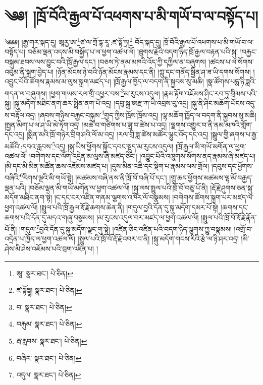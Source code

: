 \setcounter{footnote}{0} 
\chapter{༄༅། །ཁྲོ་བོའི་རྒྱལ་པོ་འཕགས་པ་མི་གཡོ་བ་ལ་བསྟོད་པ།}༄༅༅། །རྒྱ་གར་སྐད་དུ། ཨཱརྱ་ཨ་\footnote{ཨཱ་  སྣར་ཐང་།  པེ་ཅིན། }ཙ་ལ་ཀྲོ་དྷ་རཱ་:ཛ་སྟོ་ཏྲ།\footnote{ཛ་སྟོཏྟཱ།  སྣར་ཐང་།  པེ་ཅིན། } བོད་སྐད་དུ། ཁྲོ་བོའི་རྒྱལ་པོ་འཕགས་པ་མི་གཡོ་བ་ལ་བསྟོད་པ། བཅོམ་ལྡན་འདས་མི་བསྐྱོད་པ་ལ་ཕྱག་འཚལ་ལོ། །ཐུགས་རྗེའི་བདག་ཉིད་ཁྲོ་རྒྱལ་བརྟན་པའི་སྐུ། །བརྐྱང་བསྐུམ་ཐབས་ལས་བྱུང་བའི་ཁྲོ་རྒྱལ་དང་། །བཅས་ཏེ་ནམ་མཁའི་འོད་ཀྱི་དཀྱིལ་ན་བཞུགས། །ཚངས་པ་ལ་སོགས་འབུམ་ནི་སྐྲག་བྱེད་པ། །ཉོན་མོངས་ཉེ་བའི་ཉོན་མོངས་རྣམས་དང་ནི། །ཀླུ་དང་གནོད་སྦྱིན་ཤ་ཟ་ཡི་དགས་སོགས། །འབྱུང་པོའི་ཚོགས་རྣམས་མ་ལུས་སྐྲག་མཛད་པ། །ཁྲོ་རྒྱལ་ཁྱོད་ལ་བདག་ནི་སྐྱབས་སུ་མཆི། །སྣ་ཚོགས་པདྨ་ཉི་ཟླའི་གདན་ལ་བཞུགས། །ཕྱག་གཡས་རལ་གྲི་འཕྱར་བས་\footnote{བ་  སྣར་ཐང་།  པེ་ཅིན། }མ་རུངས་འདུལ། །རྣམ་རྟོག་འཇོམས་ཤིང་རབ་ཏུ་གྲིམས་པའི་སྐུ། །སྐུ་མདོག་མཐིང་ནག་ཆར་སྤྲིན་ནག་པོ་འདྲ། །དབུ་སྐྲ་ཨརྫ་ཀ་ཡི་འབྲས་བུ་འདྲ། །སྐུ་ནི་ཤིང་མཆོག་ཡོངས་འདུ་ས་བརྟོལ་འདྲ། །ཞབས་གཉིས་བརྐྱང་བསྐུམ་\footnote{བརྐུམ་  སྣར་ཐང་།  པེ་ཅིན། }གྱད་ཀྱིས་ཁྲོས་ཁྲོས་འདྲ། །ལྷ་མཆོག་ཁྱོད་ལ་བདག་ནི་སྐྱབས་སུ་མཆི། །སྤྱན་མིག་པ་ལ་ཤ་ཡི་མེ་ཏོག་འདྲ། །མཆེ་བ་གཙིགས་པ་ཟླ་བ་ཚེས་པ་འདྲ། །ལྗགས་འགྱུར་བ་ནི་ནམ་མཁའི་གློག་དང་འདྲ། །སྨིན་མའི་ཁྲོ་གཉེར་བྲིག་ཤའི་ལོ་མ་འདྲ། །རལ་གྲི་ཟླ་ཚེས་མཚོར་ལྷུང་འོད་དང་འདྲ། །སྦྲུལ་གྱི་ཞགས་པ་རྒྱ་མཚོའི་:དབའ་རླབས་\footnote{རྦ་རླབས་  སྣར་ཐང་།  པེ་ཅིན། }འདྲ། །སྐུ་ཡིས་ཕྱོགས་སྐྱོང་དབང་སྡུད་མ་རུངས་འདུལ། །ཁྲོ་རྒྱལ་མི་གཡོ་མགོན་ལ་ཕྱག་འཚལ་ལོ། །བགེགས་དང་ལོག་འདྲེན་མ་ལུས་ཞི་མཛད་ཅིང་། །འབྱུང་པོའི་འཁྲུགས་སོགས་ནད་རྣམས་ཞི་མཛད་པ། །མི་དང་མི་མིན་མཚོན་ཆས་འཇོམས་མཛད་པ། །དུས་མིན་འཆི་དང་སྡིག་པ་རྣམས་ལས་གྲོལ། །དབུས་དང་ཕྱོགས་བཞིའི་\footnote{བཞིར་  སྣར་ཐང་།  པེ་ཅིན། }རིགས་ལྔའི་མི་གཡོ་སྟེ། །མཚམས་བཞི་ནས་ནི་ཁྲོ་བོ་བཞི་པོ་དང་། །གྲུ་ཆད་ཕྱོགས་མཚམས་ལྷ་མོ་བརྒྱད་ལྡན་པའི། །བཅོམ་ལྡན་མི་གཡོ་མགོན་ལ་ཕྱག་འཚལ་ལོ། །སྐུ་ལས་སྤྲུལ་པའི་ཁྲོ་བོ་བཅུ་པོ་ནི། །རྡོ་རྗེ་ཤུགས་ཅན་སྐུ་མདོག་མཐིང་ནག་སྟེ། །ང་དང་ངར་འཛིན་གནམ་ལྕགས་འཁོར་ལོ་བསྣམས། །བགེགས་ཚོགས་སྐྲག་པར་མཛད་ལ་ཕྱག་འཚལ་ལོ། །སྤྲུལ་པའི་ཁྲོ་རྒྱལ་རྡོ་རྗེ་ཆགས་ཆེན་ནི། །གདུལ་བྱའི་དོན་དུ་སྐུ་མདོག་དམར་པོ་སྟེ། །ཆགས་དང་ཆགས་པའི་དོན་དུ་མདའ་གཞུ་བསྣམས། །མ་རུངས་འདུལ་བར་མཛད་ལ་ཕྱག་འཚལ་ལོ། །སྤྲུལ་པའི་ཁྲོ་བོ་རྡོ་རྗེ་རྣོན་པོ་ནི། །གདུལ་\footnote{འདུལ་  སྣར་ཐང་།  པེ་ཅིན། }བྱའི་དོན་དུ་སྐུ་མདོག་ལྗང་གུ་སྟེ། །འཛིན་ཅིང་འཛིན་པའི་བདག་ཉིད་ལྕགས་ཀྱུ་བསྣམས། །འགྲོ་བ་འདྲེན་པ་ཁྱོད་ལ་ཕྱག་འཚལ་ལོ། །སྤྲུལ་པའི་ཁྲོ་བོ་རྡོ་རྗེ་འབར་བ་ནི། །སྐུ་མདོག་གངས་རིའི་རྩེ་ལ་ཉི་ཤར་འདྲ། །མི་ཤེས་མི་ཤེས་འཇོམས་པའི་བྲག་འཛིན་པ། །
